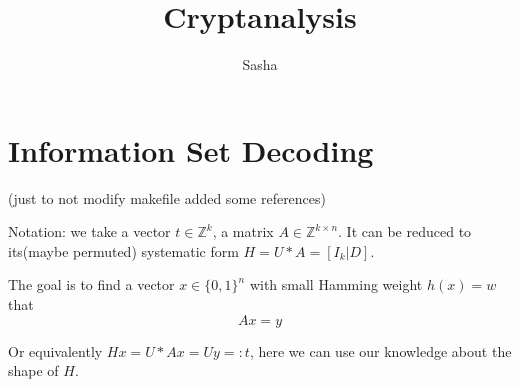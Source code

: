 \documentclass[12pt]{article}
\title{Cryptanalysis}
\author{ Sasha }
\newcommand{\ZZ}{\mathbb{Z}}
\begin{document}
\maketitle

\section{Information Set Decoding}

\cite{[DP19]}(just to not modify makefile added some references)

Notation: we take a vector $t \in \ZZ^{k}$, a matrix $A \in \ZZ^{k \times n}$. It can be reduced to its(maybe permuted) systematic form $H  = U * A = [I_{k}|D]$.


The goal is to find a vector $x \in \{0,1\}^{n}$ with small Hamming weight $h(x) = w$ that
\[
Ax = y
\]

Or equivalently $Hx = U*Ax = Uy =: t$, here we can use our knowledge about the shape of $H$.
\end{document}
